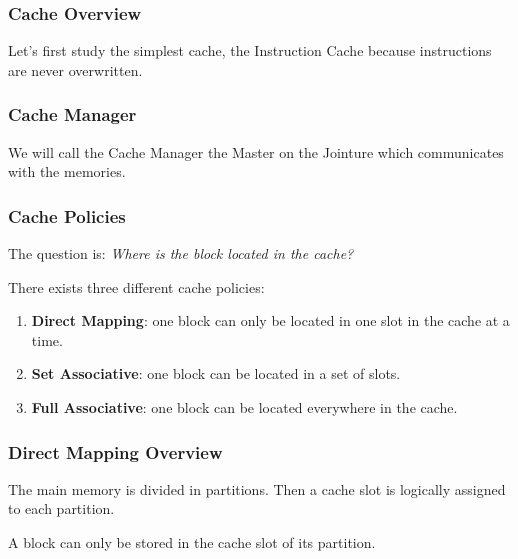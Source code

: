
\begin{frame}
  \frametitle{Cache Overview}

  Let's first study the simplest cache, the Instruction Cache because
  instructions are never overwritten.

  \begin{center}
  \end{center}
\end{frame}


\begin{frame}
  \frametitle{Cache Manager}

  We will call the Cache Manager the Master on the Jointure which communicates
  with the memories.

  \begin{center}
  \end{center}
\end{frame}


\begin{frame}
  \frametitle{Cache Policies}

  The question is: \textit{Where is the block located in the cache?}

  \-

  There exists three different cache policies:

  \begin{enumerate}
    \item
      \textbf{Direct Mapping}: one block can only be located in one
      slot in the cache at a time.
    \item
      \textbf{Set Associative}: one block can be located in a set of
      slots.
    \item
      \textbf{Full Associative}: one block can be located everywhere
      in the cache.
  \end{enumerate}
\end{frame}


\begin{frame}
  \frametitle{Direct Mapping Overview}

  The main memory is divided in partitions. Then a cache slot is
  logically assigned to each partition.

  \-

  A block can only be stored in the cache slot of its partition.
\end{frame}

